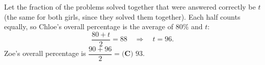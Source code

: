 Let the fraction of the problems solved together that were answered correctly be $t$ (the same for both girls, since they solved them together). Each half counts equally, so Chloe's overall percentage is the average of $80\%$ and $t$:
\[\dfrac{80+t}{2}=88\quad\Longrightarrow\quad t=96.\]
Zoe's overall percentage is $\dfrac{90+96}{2}=\boxed{\textbf{(C) }93}$.
